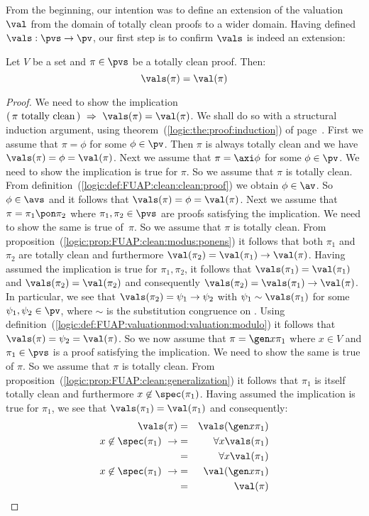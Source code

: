 From the beginning, our intention was to define an extension of the
valuation $\val$ from the domain of totally clean proofs to a wider
domain. Having defined $\vals:\pvs\to\pv$, our first step is to
confirm $\vals$ is indeed an extension:
\begin{prop}\label{logic:prop:FUAP:valuationmod:clean:proof}
Let $V$ be a set and $\pi\in\pvs$ be a totally clean proof. Then:
    \[
    \vals(\pi)=\val(\pi)
    \]
\end{prop}
\begin{proof}
We need to show the implication $(\,\mbox{$\pi$ totally clean}\,)\
\Rightarrow\ \vals(\pi)=\val(\pi)$. We shall do so with a structural
induction argument, using theorem~(\ref{logic:the:proof:induction})
of page~\pageref{logic:the:proof:induction}. First we assume that
$\pi=\phi$ for some $\phi\in\pv$. Then $\pi$ is always totally clean
and we have $\vals(\pi)=\phi=\val(\pi)$. Next we assume that
$\pi=\axi\phi$ for some $\phi\in\pv$. We need to show the
implication is true for $\pi$. So we assume that $\pi$ is totally
clean. From definition~(\ref{logic:def:FUAP:clean:clean:proof}) we
obtain $\phi\in\av$. So $\phi\in\avs$ and it follows that
$\vals(\pi)=\phi=\val(\pi)$. Next we assume that
$\pi=\pi_{1}\pon\pi_{2}$ where $\pi_{1},\pi_{2}\in\pvs$ are proofs
satisfying the implication. We need to show the same is true
of~$\pi$. So we assume that $\pi$ is totally clean. From
proposition~(\ref{logic:prop:FUAP:clean:modus:ponens}) it follows
that both $\pi_{1}$ and $\pi_{2}$ are totally clean and furthermore
$\val(\pi_{2})=\val(\pi_{1})\to\val(\pi)$. Having assumed the
implication is true for $\pi_{1},\pi_{2}$, it follows that
$\vals(\pi_{1})=\val(\pi_{1})$ and $\vals(\pi_{2})=\val(\pi_{2})$
and consequently $\vals(\pi_{2})=\vals(\pi_{1})\to\val(\pi)$. In
particular, we see that $\vals(\pi_{2})=\psi_{1}\to\psi_{2}$ with
$\psi_{1}\sim\vals(\pi_{1})$ for some $\psi_{1},\psi_{2}\in\pv$,
where $\sim$ is the substitution congruence on \pv. Using
definition~(\ref{logic:def:FUAP:valuationmod:valuation:modulo}) it
follows that $\vals(\pi)=\psi_{2}=\val(\pi)$. So we now assume that
$\pi=\gen x\pi_{1}$ where $x\in V$ and $\pi_{1}\in\pvs$ is a proof
satisfying the implication. We need to show the same is true of
$\pi$. So we assume that $\pi$ is totally clean. From
proposition~(\ref{logic:prop:FUAP:clean:generalization}) it follows
that $\pi_{1}$ is itself totally clean and furthermore
$x\not\in\spec(\pi_{1})$. Having assumed the implication is true for
$\pi_{1}$, we see that $\vals(\pi_{1})=\val(\pi_{1})$ and
consequently:
    \begin{eqnarray*}
    \vals(\pi)&=&\vals(\gen x\pi_{1})\\
    x\not\in\spec(\pi_{1})\ \rightarrow
    &=&\forall x\vals(\pi_{1})\\
    &=&\forall x\val(\pi_{1})\\
    x\not\in\spec(\pi_{1})\ \rightarrow
    &=&\val(\gen x\pi_{1})\\
    &=&\val(\pi)
    \end{eqnarray*}
\end{proof}

